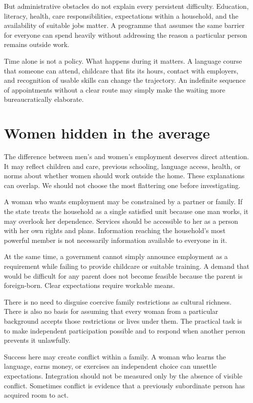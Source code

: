 \documentclass[12pt,a4paper]{book}
\begin{document}
But administrative obstacles do not explain every persistent difficulty. Education, literacy, health, care responsibilities, expectations within a household, and the availability of suitable jobs matter. A programme that assumes the same barrier for everyone can spend heavily without addressing the reason a particular person remains outside work.

Time alone is not a policy. What happens during it matters. A language course that someone can attend, childcare that fits its hours, contact with employers, and recognition of usable skills can change the trajectory. An indefinite sequence of appointments without a clear route may simply make the waiting more bureaucratically elaborate.

\section*{Women hidden in the average}

The difference between men's and women's employment deserves direct attention. It may reflect children and care, previous schooling, language access, health, or norms about whether women should work outside the home. These explanations can overlap. We should not choose the most flattering one before investigating.

A woman who wants employment may be constrained by a partner or family. If the state treats the household as a single satisfied unit because one man works, it may overlook her dependence. Services should be accessible to her as a person with her own rights and plans. Information reaching the household's most powerful member is not necessarily information available to everyone in it.

At the same time, a government cannot simply announce employment as a requirement while failing to provide childcare or suitable training. A demand that would be difficult for any parent does not become feasible because the parent is foreign-born. Clear expectations require workable means.

There is no need to disguise coercive family restrictions as cultural richness. There is also no basis for assuming that every woman from a particular background accepts those restrictions or lives under them. The practical task is to make independent participation possible and to respond when another person prevents it unlawfully.

Success here may create conflict within a family. A woman who learns the language, earns money, or exercises an independent choice can unsettle expectations. Integration should not be measured only by the absence of visible conflict. Sometimes conflict is evidence that a previously subordinate person has acquired room to act.
\end{document}
